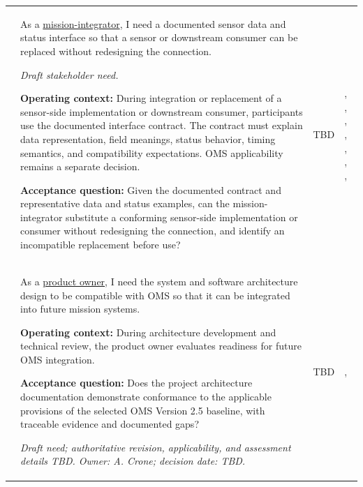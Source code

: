 \begin{tabularx}{\linewidth}{L{1.9cm}YL{1.8cm}L{3.4cm}}
 & As a \hyperref[Stakeholder:MissionIntegrator]{mission-integrator}, I need a documented sensor data and status interface so that a sensor or downstream consumer can be replaced without redesigning the connection. \par\textit{Draft stakeholder need.} \par\textbf{Operating context:} During integration or replacement of a sensor-side implementation or downstream consumer, participants use the documented interface contract. The contract must explain data representation, field meanings, status behavior, timing semantics, and compatibility expectations. OMS applicability remains a separate decision. \par\textbf{Acceptance question:} Given the documented contract and representative data and status examples, can the mission-integrator substitute a conforming sensor-side implementation or consumer without redesigning the connection, and identify an incompatible replacement before use? & TBD & , , , , , , , \\
 & As a \hyperref[Stakeholder:ProductOwner]{product owner}, I need the system and software architecture design to be compatible with OMS so that it can be integrated into future mission systems. \par\textbf{Operating context:} During architecture development and technical review, the product owner evaluates readiness for future OMS integration. \par\textbf{Acceptance question:} Does the project architecture documentation demonstrate conformance to the applicable provisions of the selected OMS Version 2.5 baseline, with traceable evidence and documented gaps? \par\textit{Draft need; authoritative revision, applicability, and assessment details TBD. Owner: A. Crone; decision date: TBD.} & TBD & , \\
\end{tabularx}

